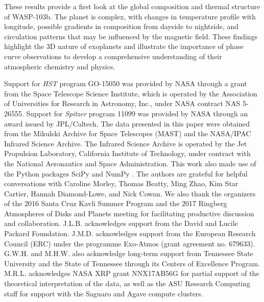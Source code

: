 \documentclass[twocolumn, trackchanges]{aastex61}
\begin{document}
These results provide a first look at the global composition and thermal structure of WASP-103b.  The planet is complex, with changes in temperature profile with longitude, possible gradients in composition from dayside to nightside, and circulation patterns that may be influenced by the magnetic field. These findings highlight the 3D nature of exoplanets and illustrate the importance of phase curve observations to develop a comprehensive understanding of their atmospheric chemistry and physics.  



\acknowledgments
Support for \textit{HST} program GO-15050 was provided by NASA through a grant
from the Space Telescope Science Institute, which is operated by the Association
of Universities for Research in Astronomy, Inc., under NASA contract NAS
5-26555. Support for \textit{Spitzer} program 11099 was provided by NASA through
an award issued by JPL/Caltech.  The data presented in this paper were obtained
from the Mikulski Archive for Space Telescopes (MAST) and the NASA/IPAC Infrared
Science Archive. The Infrared Science Archive is operated by the Jet Propulsion
Laboratory, California Institute of Technology, under contract with the National
Aeronautics and Space Administration.  This work also made use of the Python
packages  SciPy and NumPy \citep{jones_scipy_2001, van2011numpy}. The authors
are grateful for helpful conversations with Caroline Morley, Thomas Beatty, Ming
Zhao, Kim Star Cartier, Hannah Diamond-Lowe, and Nick Cowan. We also thank the
organizers of the 2016 Santa Cruz Kavli Summer Program and the 2017 Ringberg
Atmospheres of Disks and Planets meeting for facilitating productive discussion
and collaboration.  J.L.B. acknowledges support from the David and Lucile
Packard Foundation.  J.M.D. acknowledges support from the European Research
Council (ERC) under the programme Exo-Atmos (grant agreement no. 679633). G.W.H.
and M.H.W. also acknowledge long-term support from Tennessee State University
and the State of Tennessee through its Centers of Excellence Program. M.R.L.
acknowledges NASA XRP grant NNX17AB56G for partial support of the theoretical
interpretation of the data, as well as the ASU Research Computing staff for support with the Saguaro and Agave compute clusters.
\end{document}
